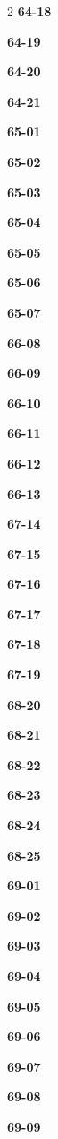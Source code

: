 \documentclass[10pt,a4paper]{article}
\begin{document}
\begin{multicols}{2}
\noindent\textbf{64-18}\ \par
\noindent\textbf{64-19}\ \par
\noindent\textbf{64-20}\ \par
\noindent\textbf{64-21}\ \par
\noindent\textbf{65-01}\ \par
\noindent\textbf{65-02}\ \par
\noindent\textbf{65-03}\ \par
\noindent\textbf{65-04}\ \par
\noindent\textbf{65-05}\ \par
\noindent\textbf{65-06}\ \par
\noindent\textbf{65-07}\ \par
\noindent\textbf{66-08}\ \par
\noindent\textbf{66-09}\ \par
\noindent\textbf{66-10}\ \par
\noindent\textbf{66-11}\ \par
\noindent\textbf{66-12}\ \par
\noindent\textbf{66-13}\ \par
\noindent\textbf{67-14}\ \par
\noindent\textbf{67-15}\ \par
\noindent\textbf{67-16}\ \par
\noindent\textbf{67-17}\ \par
\noindent\textbf{67-18}\ \par
\noindent\textbf{67-19}\ \par
\noindent\textbf{68-20}\ \par
\noindent\textbf{68-21}\ \par
\noindent\textbf{68-22}\ \par
\noindent\textbf{68-23}\ \par
\noindent\textbf{68-24}\ \par
\noindent\textbf{68-25}\ \par
\noindent\textbf{69-01}\ \par
\noindent\textbf{69-02}\ \par
\noindent\textbf{69-03}\ \par
\noindent\textbf{69-04}\ \par
\noindent\textbf{69-05}\ \par
\noindent\textbf{69-06}\ \par
\noindent\textbf{69-07}\ \par
\noindent\textbf{69-08}\ \par
\noindent\textbf{69-09}\ \par

\end{multicols}
\end{document}
